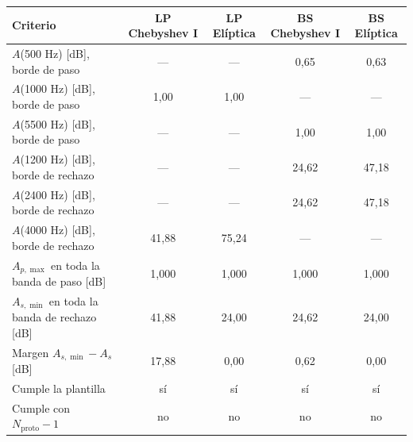 \begin{tabular}{@{}lcccc@{}}
\toprule
Criterio & LP Chebyshev I & LP Elíptica & BS Chebyshev I & BS Elíptica \\
\midrule
$A$(500 Hz) [dB], borde de paso & --- & --- & 0{,}65 & 0{,}63 \\
$A$(1000 Hz) [dB], borde de paso & 1{,}00 & 1{,}00 & --- & --- \\
$A$(5500 Hz) [dB], borde de paso & --- & --- & 1{,}00 & 1{,}00 \\
$A$(1200 Hz) [dB], borde de rechazo & --- & --- & 24{,}62 & 47{,}18 \\
$A$(2400 Hz) [dB], borde de rechazo & --- & --- & 24{,}62 & 47{,}18 \\
$A$(4000 Hz) [dB], borde de rechazo & 41{,}88 & 75{,}24 & --- & --- \\
\midrule
$A_{p,\max}$ en toda la banda de paso [dB] & 1{,}000 & 1{,}000 & 1{,}000 & 1{,}000 \\
$A_{s,\min}$ en toda la banda de rechazo [dB] & 41{,}88 & 24{,}00 & 24{,}62 & 24{,}00 \\
Margen $A_{s,\min}-A_s$ [dB] & 17{,}88 & 0{,}00 & 0{,}62 & 0{,}00 \\
Cumple la plantilla & sí & sí & sí & sí \\
Cumple con $N_\mathrm{proto}-1$ & no & no & no & no \\
\bottomrule
\end{tabular}